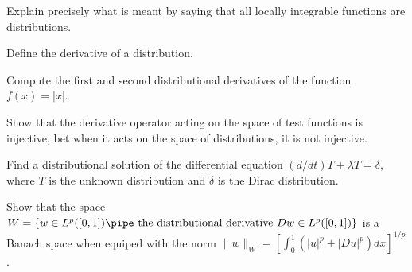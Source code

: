 \begin{alist}
\item Explain precisely what is meant by saying that all locally
integrable functions are distributions.
\item Define the derivative of a distribution.
\item Compute the first and second distributional derivatives of the
function $f(x)=|x|$.
\item Show that the derivative operator acting on the space of test
functions is injective, bet when it acts on the space of
distributions, it is not injective.
\item Find a distributional solution of the differential equation
$(d/dt)T+\lambda T=\delta$, where $T$ is the unknown distribution and
$\delta$ is the Dirac distribution.
\item Show that the space $W=\{w\in L^p([0,1])\pipe\text{\ the
distributional derivative\ } Dw\in L^p([0,1])\}$ is a Banach space
when equiped with the norm $\|w\|_{W}=[\int_{0}^1
(|u|^p+|Du|^p)dx]^{1/p}$.
\end{alist}


